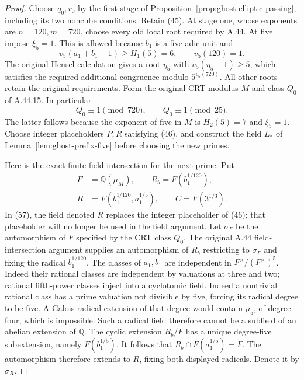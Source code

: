 \begin{proof}
Choose \(q_0,r_0\) by the first stage of
Proposition~\ref{prop:ghost-elliptic-passing},
including its two noncube conditions. Retain (45).
At stage one, whose exponents are \(n=120,m=720\),
choose every old local root required by A.44.
At five impose \(\xi_5=1\). This is allowed
because \(b_1\) is a five-adic unit and
\[
 v_5(a_1+b_1-1)\ge H_1(5)=6,
                    \qquad v_5(120)=1.
\]
The original Hensel calculation gives a root
\(\eta_5\) with \(v_5(\eta_5-1)\ge5\),
which satisfies the required additional congruence
modulo \(5^{v_5(720)}\). All other roots retain
the original requirements. Form the original CRT
modulus \(M\) and class \(Q_0\) of A.44.15.
In particular
\[
 Q_0\equiv1\pmod{720},\qquad
                  Q_0\equiv1\pmod{25}.              \tag{56}
\]
The latter follows because the exponent of five
in \(M\) is \(H_2(5)=7\) and \(\xi_5=1\).
Choose integer placeholders \(P,R\) satisfying
(46), and construct the field \(L_*\) of
Lemma~\ref{lem:ghost-prefix-five} before choosing
the new primes.

Here is the exact finite field intersection for
the next prime. Put
\[
 \begin{split}
 F&=\mathbb Q(\mu_M),\qquad
 R_b=F(b_1^{1/120}),\\
 R&=F(b_1^{1/120},a_1^{1/5}),\qquad
 C=F(3^{1/3}).
 \end{split}                                         \tag{57}
\]
In (57), the field denoted \(R\) replaces the
integer placeholder of (46); that placeholder
will no longer be used in the field argument.
Let \(\sigma_F\) be the automorphism of \(F\)
specified by the CRT class \(Q_0\).
The original A.44 field-intersection argument
supplies an automorphism of \(R_b\) restricting
to \(\sigma_F\) and fixing the radical
\(b_1^{1/120}\).
The classes of \(a_1,b_1\) are independent in
\(F^\times/(F^\times)^5\). Indeed their rational
classes are independent by valuations at three
  and two; rational fifth-power classes inject into
a cyclotomic field. Indeed a nontrivial rational
class has a prime valuation not divisible by five,
forcing its radical degree to be five. A Galois
radical extension of that degree would contain
\(\mu_5\), of degree four, which is impossible.
Such a radical field therefore cannot be a subfield
of an abelian extension of \(\mathbb Q\).
The cyclic extension \(R_b/F\) has a unique
degree-five subextension, namely \(F(b_1^{1/5})\).
It follows that
\(R_b\cap F(a_1^{1/5})=F\). The automorphism
therefore extends to \(R\), fixing both displayed
radicals. Denote it by \(\sigma_R\).


\end{proof}
